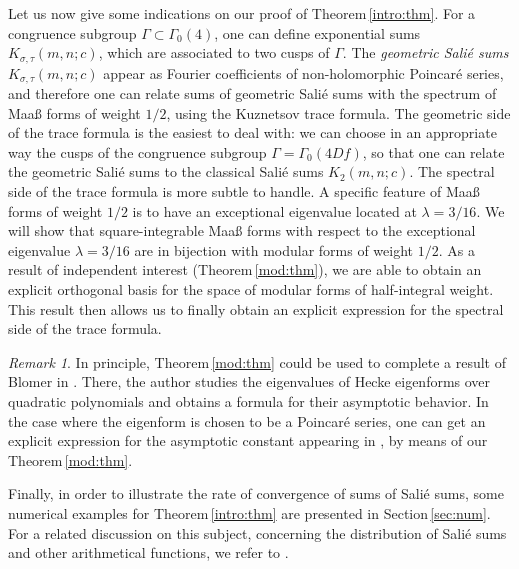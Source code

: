 \documentclass[leqno,10pt]{amsart}
\theoremstyle{plain}
\numberwithin{equation}{section}
\theoremstyle{definition}
\theoremstyle{remark}
\newtheorem{rque}[thm]{Remark}
\begin{document}
Let us now give some indications on our proof of Theorem\,\ref{intro:thm}. For a congruence subgroup $\Gamma\subset \Gamma_0(4)$, one can define exponential sums $K_{\sigma,\tau}(m,n;c)$, which are associated to two cusps of $\Gamma$. The {\it geometric Sali\'e sums} $K_{\sigma,\tau}(m,n;c)$ appear as Fourier coefficients of non-holomorphic Poincar\'e series, and therefore one can relate sums of geometric Sali\'e sums with the spectrum of Maa\ss{} forms of weight $1/2$, using  the Kuznetsov trace formula. The geometric side of the trace formula is the easiest to deal with: we can choose in an appropriate way the cusps of the congruence subgroup $\Gamma=\Gamma_0(4Df)$, so that one can relate the geometric Sali\'e sums to the classical Sali\'e sums $K_2(m,n;c)$. The spectral side of the trace formula is more subtle to handle. A specific feature of Maa\ss{} forms of weight $1/2$ is to have an exceptional eigenvalue located at $\lambda=3/16$. We will show that square-integrable Maa\ss{} forms with respect to the exceptional eigenvalue $\lambda=3/16$ are in bijection with modular forms of weight $1/2$. 
As a result of independent interest (Theorem\,\ref{mod:thm}), we are able to obtain an explicit orthogonal basis for the space of modular forms of half-integral weight. This result then allows us to finally obtain an explicit expression for the spectral side of the trace formula. 

\begin{rque}
In principle, Theorem\,\ref{mod:thm} could be used to complete a result of Blomer in \cite{blo:hecke-quadr-poly}. There, the author studies the eigenvalues of Hecke eigenforms over quadratic polynomials and obtains a formula for their asymptotic behavior. In the case where the eigenform is chosen to be a Poincar\'e series, one can get an explicit expression for the asymptotic constant appearing in \cite[(1.4)]{blo:hecke-quadr-poly}, by means of our Theorem\,\ref{mod:thm}.
\end{rque}  

Finally, in order to illustrate the rate of convergence of sums of Sali\'e sums, some numerical examples for Theorem\,\ref{intro:thm} are presented in Section\,\ref{sec:num}. For a related discussion on this subject, concerning the distribution of Sali\'e sums and other arithmetical functions, we refer to \cite{pat:distrib-arith}.\\
\end{document}
